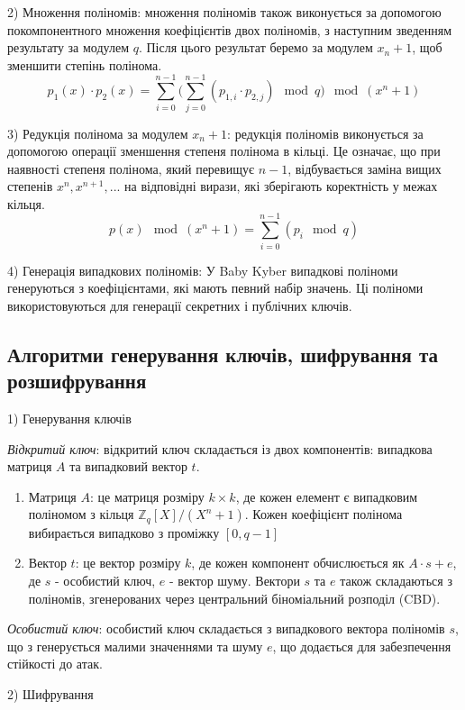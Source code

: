 2) Множення поліномів: множення поліномів також виконується за допомогою покомпонентного множення коефіцієнтів двох поліномів, з наступним зведенням результату за модулем $q$. Після цього результат беремо за модулем $x_n + 1$, щоб зменшити степінь полінома. 
$$p_1(x)\cdot  p_2(x) = \sum^{n-1}_{i=0}\big(\sum^{n-1}_{j=0}(p_{1,i} \cdot p_{2,j}) \mod q\big) \mod (x^n+1)$$

3) Редукція полінома за модулем $x_n + 1$: редукція поліномів виконується за допомогою операції зменшення степеня полінома в кільці.  Це означає, що при наявності степеня полінома, який перевищує $n - 1$, відбувається заміна вищих степенів 
$x^n, x^{n+1}, ...$ на відповідні вирази, які зберігають коректність у межах кільця. 
$$p(x) \mod (x^n+1)= \sum^{n-1}_{i=0}(p_i \mod q)  $$

4) Генерація випадкових поліномів: У Baby Kyber випадкові поліноми генеруються з коефіцієнтами, які мають певний набір значень. Ці поліноми використовуються для генерації секретних і публічних ключів.

\subsection*{Алгоритми генерування ключів, шифрування та розшифрування}

1) Генерування ключів

\textit{Відкритий ключ}: відкритий ключ складається із двох компонентів: випадкова матриця $A$ та випадковий вектор $t$.
\begin{enumerate}[label=\alph*)]
    \item Матриця $A$: це матриця розміру $k\times k$,  де кожен елемент є випадковим поліномом з кільця $\mathbb{Z}_q[X]/(X^n+1)$. Кожен коефіцієнт полінома вибирається випадково з проміжку $[0, q - 1]$

    \item Вектор $t$: це вектор розміру $k$, де кожен компонент обчислюється як $A\cdot s + e$, де $s$ - особистий ключ, $e$ - вектор шуму. Вектори $s$ та $e$ також складаються з поліномів, згенерованих через центральний біноміальний розподіл (CBD).
\end{enumerate}

\textit{Особистий ключ}: особистий ключ складається з випадкового вектора поліномів $s$, що з генерується малими значеннями та шуму $e$, що додається для забезпечення стійкості до атак.

2) Шифрування

